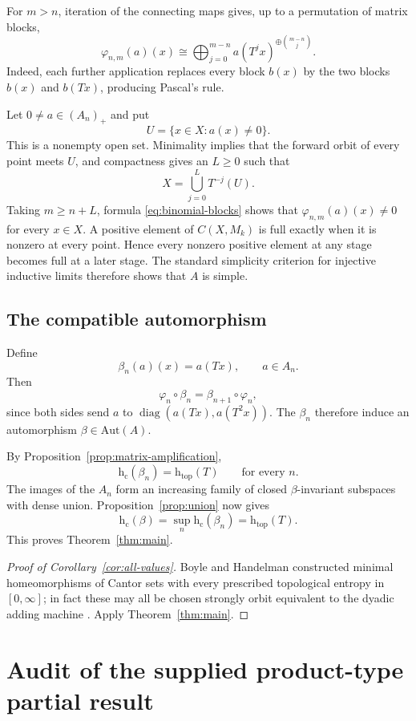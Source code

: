 \documentclass[11pt]{article}
\theoremstyle{remark}
\newcommand{\hc}{\mathrm{h}_{\mathrm c}}
\newcommand{\htop}{\mathrm{h}_{\mathrm{top}}}
\newcommand{\Aut}{\mathrm{Aut}}
\begin{document}
For $m>n$, iteration of the connecting maps gives, up to a permutation of
matrix blocks,
\begin{equation}\label{eq:binomial-blocks}
 \varphi_{n,m}(a)(x)
 \cong
 \bigoplus_{j=0}^{m-n}
 a(T^j x)^{\oplus \binom{m-n}{j}}.
\end{equation}
Indeed, each further application replaces every block $b(x)$ by the two
blocks $b(x)$ and $b(Tx)$, producing Pascal's rule.

Let $0\neq a\in(A_n)_+$ and put
\[
  U=\{x\in X:a(x)\neq0\}.
\]
This is a nonempty open set.  Minimality implies that the forward orbit of
every point meets $U$, and compactness gives an $L\geq0$ such that
\[
  X=\bigcup_{j=0}^{L}T^{-j}(U).
\]
Taking $m\geq n+L$, formula \eqref{eq:binomial-blocks} shows that
$\varphi_{n,m}(a)(x)\neq0$ for every $x\in X$.  A positive element of
$C(X,M_k)$ is full exactly when it is nonzero at every point.  Hence every
nonzero positive element at any stage becomes full at a later stage.  The
standard simplicity criterion for injective inductive limits therefore
shows that $A$ is simple.

\subsection{The compatible automorphism}

Define
\[
  \beta_n(a)(x)=a(Tx),\qquad a\in A_n.
\]
Then
\[
 \varphi_n\circ\beta_n=\beta_{n+1}\circ\varphi_n,
\]
since both sides send $a$ to
$\operatorname{diag}(a(Tx),a(T^2x))$.  The $\beta_n$ therefore induce an
automorphism $\beta\in\Aut(A)$.

By Proposition~\ref{prop:matrix-amplification},
\[
  \hc(\beta_n)=\htop(T)
  \qquad\text{for every }n.
\]
The images of the $A_n$ form an increasing family of closed
$\beta$-invariant subspaces with dense union.  Proposition~\ref{prop:union}
now gives
\[
  \hc(\beta)
  =\sup_n\hc(\beta_n)
  =\htop(T).
\]
This proves Theorem~\ref{thm:main}.

\begin{proof}[Proof of Corollary~\ref{cor:all-values}]
Boyle and Handelman constructed minimal homeomorphisms of Cantor sets with
every prescribed topological entropy in $[0,\infty]$; in fact these may all
be chosen strongly orbit equivalent to the dyadic adding machine
\cite{BoyleHandelman}.  Apply Theorem~\ref{thm:main}.
\end{proof}

\section{Audit of the supplied product-type partial result}
\end{document}
